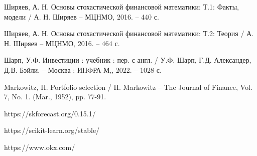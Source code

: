 \newpage
{}
\renewcommand{\bibsection}{\centering\textbf{\large СПИСОК ИСПОЛЬЗОВАННЫХ ИСТОЧНИКОВ}}



\begin{thebibliography}{99}
    Ширяев, А. Н. Основы стохастической финансовой математики: Т.1: Факты, модели / А. Н. Ширяев -- МЦНМО, 2016. -- 440 с.

    Ширяев, А. Н. Основы стохастической финансовой математики: Т.2: Теория / А. Н. Ширяев -- МЦНМО, 2016. -- 464 с.

    Шарп, У.Ф. Инвестиции : учебник : пер. с англ. / У.Ф. Шарп, Г.Д. Александер, Д.В. Бэйли. -- Москва : ИНФРА-М,, 2022. -- 1028 с.

    Markowitz, H. Portfolio selection / H. Markowitz -- The Journal of Finance, Vol. 7, No. 1. (Mar., 1952), pp. 77-91.

    https://skforecast.org/0.15.1/

    https://scikit-learn.org/stable/
    
    https://www.okx.com/

\end{thebibliography}
